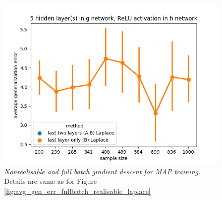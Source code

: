 \documentclass[11pt]{article}
\numberwithin{equation}{section}
\theoremstyle{plain}
\theoremstyle{definition}
\begin{document}
\begin{figure}[t!]
\begin{center}
		\includegraphics[scale=0.45]{laplace_taskid3.png}
	\end{center}
	\caption{\textit{Nonrealisable and full batch gradient descent for MAP training.} Details are same as for Figure \ref{fig:avg_gen_err_fullbatch_realisable_laplace}
	}
	\label{fig:avg_gen_err_fullbatch_nonrealisable_laplace}
\end{figure}
\end{document}
